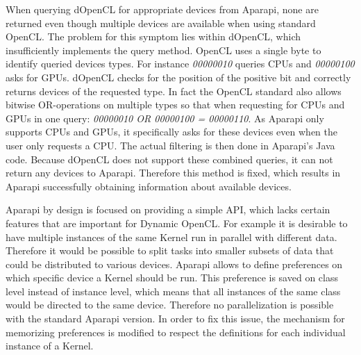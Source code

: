 \begin{description}[style=nextline]
	\item [No available devices]
	When querying dOpenCL for appropriate devices from Aparapi, none are returned even though multiple devices are available when using standard OpenCL. The problem for this symptom lies within dOpenCL, which insufficiently implements the query method. OpenCL uses a single byte to identify queried devices types. For instance \textit{00000010} queries CPUs and \textit{00000100} asks for GPUs. dOpenCL checks for the position of the positive bit and correctly returns devices of the requested type. In fact the OpenCL standard also allows bitwise OR-operations on multiple types so that when requesting for CPUs and GPUs in one query: \textit{00000010 OR 00000100 = 00000110}. As Aparapi only supports CPUs and GPUs, it specifically asks for these devices even when the user only requests a CPU. The actual filtering is then done in Aparapi's Java code. Because dOpenCL does not support these combined queries, it can not return any devices to Aparapi. Therefore this method is fixed, which results in Aparapi successfully obtaining information about available devices.
	
	\item [Specific device choice]
	Aparapi by design is focused on providing a simple API, which lacks certain features that are important for Dynamic OpenCL. For example it is desirable to have multiple instances of the same Kernel run in parallel with different data. Therefore it would be possible to split tasks into smaller subsets of data that could be distributed to various devices. Aparapi allows to define preferences on which specific device a Kernel should be run. This preference is saved on class level instead of instance level, which means that all instances of the same class would be directed to the same device. Therefore no parallelization is possible with the standard Aparapi version. In order to fix this issue, the mechanism for memorizing preferences is modified to respect the definitions for each individual instance of a Kernel.
	

\end{description}
